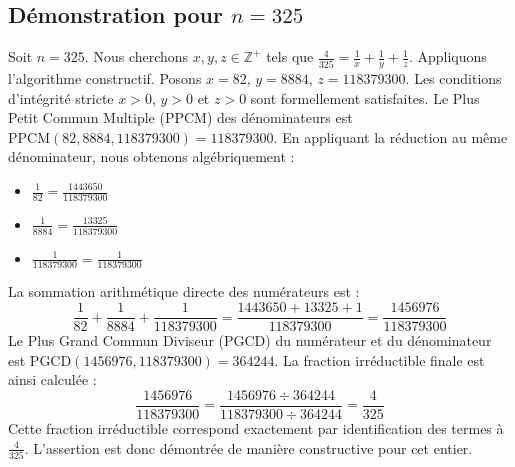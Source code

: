 \documentclass[11pt,a4paper]{article}
\begin{document}
\subsection{Démonstration pour $n = 325$}
Soit $n = 325$. Nous cherchons $x, y, z \in \mathbb{Z}^{+}$ tels que $\frac{4}{325} = \frac{1}{x} + \frac{1}{y} + \frac{1}{z}$.
Appliquons l'algorithme constructif. Posons $x = 82$, $y = 8884$, $z = 118379300$.
Les conditions d'intégrité stricte $x > 0$, $y > 0$ et $z > 0$ sont formellement satisfaites.
Le Plus Petit Commun Multiple (PPCM) des dénominateurs est $\text{PPCM}(82, 8884, 118379300) = 118379300$.
En appliquant la réduction au même dénominateur, nous obtenons algébriquement :
\begin{itemize}
    \item $\frac{1}{82} = \frac{1443650}{118379300}$
    \item $\frac{1}{8884} = \frac{13325}{118379300}$
    \item $\frac{1}{118379300} = \frac{1}{118379300}$
\end{itemize}
La sommation arithmétique directe des numérateurs est :
$$ \frac{1}{82} + \frac{1}{8884} + \frac{1}{118379300} = \frac{1443650 + 13325 + 1}{118379300} = \frac{1456976}{118379300} $$
Le Plus Grand Commun Diviseur (PGCD) du numérateur et du dénominateur est $\text{PGCD}(1456976, 118379300) = 364244$.
La fraction irréductible finale est ainsi calculée :
$$ \frac{1456976}{118379300} = \frac{1456976 \div 364244}{118379300 \div 364244} = \frac{4}{325} $$
Cette fraction irréductible correspond exactement par identification des termes à $\frac{4}{325}$. L'assertion est donc démontrée de manière constructive pour cet entier.
\end{document}
